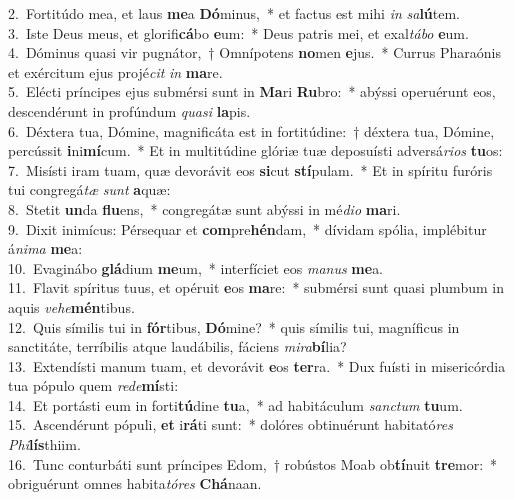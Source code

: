 {2.~}Fortitúdo mea, et laus \textbf{me}a \textbf{Dó}minus,~* et factus est mihi \textit{in} \textit{sa}\textbf{lú}tem.\\
{3.~}Iste Deus meus, et glorifi\textbf{cá}bo \textbf{e}um:~* Deus patris mei, et exal\textit{tá}\textit{bo} \textbf{e}um.\\
{4.~}Dóminus quasi vir pugnátor,~† Omnípotens \textbf{no}men \textbf{e}jus.~* Currus Pharaónis et exércitum ejus projé\textit{cit} \textit{in} \textbf{ma}re.\\
{5.~}Elécti príncipes ejus submérsi sunt in \textbf{Ma}ri \textbf{Ru}bro:~* abýssi operuérunt eos, descendérunt in profúndum \textit{qua}\textit{si} \textbf{la}pis.\\
{6.~}Déxtera tua, Dómine, magnificáta est in fortitúdine:~† déxtera tua, Dómine, percússit \textbf{i}ni\textbf{mí}cum.~* Et in multitúdine glóriæ tuæ deposuísti adversá\textit{ri}\textit{os} \textbf{tu}os:\\
{7.~}Misísti iram tuam, quæ devorávit eos \textbf{si}cut \textbf{stí}pulam.~* Et in spíritu furóris tui congregá\textit{tæ} \textit{sunt} \textbf{a}quæ:\\
{8.~}Stetit \textbf{un}da \textbf{flu}ens,~* congregátæ sunt abýssi in mé\textit{di}\textit{o} \textbf{ma}ri.\\
{9.~}Dixit inimícus: Pérsequar et \textbf{com}pre\textbf{hén}dam,~* dívidam spólia, implébitur á\textit{ni}\textit{ma} \textbf{me}a:\\
{10.~}Evaginábo \textbf{glá}dium \textbf{me}um,~* interfíciet eos \textit{ma}\textit{nus} \textbf{me}a.\\
{11.~}Flavit spíritus tuus, et opéruit \textbf{e}os \textbf{ma}re:~* submérsi sunt quasi plumbum in aquis \textit{ve}\textit{he}\textbf{mén}tibus.\\
{12.~}Quis símilis tui in \textbf{fór}tibus, \textbf{Dó}mine?~* quis símilis tui, magníficus in sanctitáte, terríbilis atque laudábilis, fáciens \textit{mi}\textit{ra}\textbf{bí}lia?\\
{13.~}Extendísti manum tuam, et devorávit \textbf{e}os \textbf{ter}ra.~* Dux fuísti in misericórdia tua pópulo quem \textit{re}\textit{de}\textbf{mí}sti:\\
{14.~}Et portásti eum in forti\textbf{tú}dine \textbf{tu}a,~* ad habitáculum \textit{san}\textit{ctum} \textbf{tu}um.\\
{15.~}Ascendérunt pópuli, \textbf{et} i\textbf{rá}ti sunt:~* dolóres obtinuérunt habitató\textit{res} \textit{Phi}\textbf{lís}thiim.\\
{16.~}Tunc conturbáti sunt príncipes Edom,~† robústos Moab ob\textbf{tí}nuit \textbf{tre}mor:~* obriguérunt omnes habita\textit{tó}\textit{res} \textbf{Chá}naan.\\
